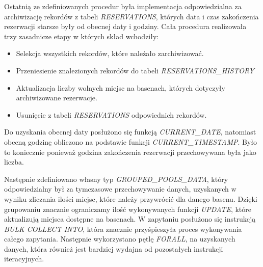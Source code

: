 \documentclass[a4paper]{article}
\begin{document}
 \newpage

Ostatnią ze zdefiniowanych procedur była implementacja odpowiedzialna za archiwizację rekordów z tabeli \textit{RESERVATIONS}, których data i czas zakończenia rezerwacji starsze były od obecnej daty i godziny.  Cała procedura realizowała trzy zasadnicze etapy w których skład wchodziły:
\begin{itemize}
    \item Selekcja wszystkich rekordów, które należało zarchiwizować.
    \item Przeniesienie znalezionych rekordów do tabeli \textit{RESERVATIONS\_HISTORY}
    \item Aktualizacja liczby wolnych miejsc na basenach, których dotyczyły archiwizowane rezerwacje.
    \item Usunięcie z tabeli \textit{RESERVATIONS} odpowiednich rekordów.
\end{itemize}

Do uzyskania obecnej daty posłużono się funkcją \textit{CURRENT\_DATE}, natomiast obecną godzinę obliczono na podstawie funkcji \textit{CURRENT\_TIMESTAMP}. Było to koniecznie ponieważ godzina zakończenia rezerwacji przechowywana była jako liczba.

Następnie zdefiniowano własny typ \textit{ GROUPED\_POOLS\_DATA}, który odpowiedzialny był za tymczasowe przechowywanie danych, uzyskanych w wyniku zliczania ilości miejsc, które należy przywrócić dla danego basenu. Dzięki grupowaniu znacznie ograniczamy ilość wykonywanych funkcji \textit{UPDATE}, które aktualizują miejsca dostępne na basenach. W zapytaniu posłużono się instrukcją \textit{BULK COLLECT INTO}, która znacznie przyśpieszyła proces wykonywania całego zapytania. Następnie wykorzystano pętlę \textit{FORALL}, na uzyskanych danych, która również jest bardziej wydajna od pozostałych instrukcji iteracyjnych.

\newpage
\end{document}
